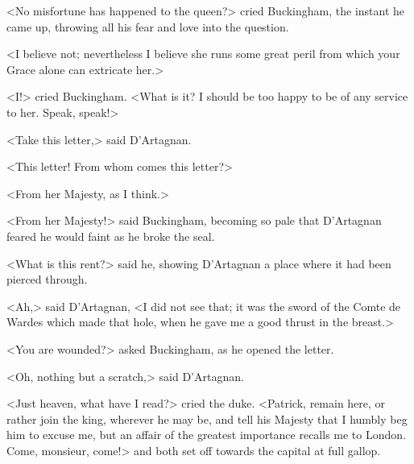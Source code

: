 <No misfortune has happened to the queen?> cried Buckingham, the instant he came up, throwing all his fear and love into the question. 

<I believe not; nevertheless I believe she runs some great peril from which your Grace alone can extricate her.> 

<I\@!> cried Buckingham. <What is it? I should be too happy to be of any service to her. Speak, speak!> 

<Take this letter,> said D'Artagnan. 

<This letter! From whom comes this letter?> 

<From her Majesty, as I think.> 

<From her Majesty!> said Buckingham, becoming so pale that D'Artagnan feared he would faint as he broke the seal. 

<What is this rent?> said he, showing D'Artagnan a place where it had been pierced through. 

<Ah,> said D'Artagnan, <I did not see that; it was the sword of the Comte de Wardes which made that hole, when he gave me a good thrust in the breast.> 

<You are wounded?> asked Buckingham, as he opened the letter. 

<Oh, nothing but a scratch,> said D'Artagnan. 

<Just heaven, what have I read?> cried the duke. <Patrick, remain here, or rather join the king, wherever he may be, and tell his Majesty that I humbly beg him to excuse me, but an affair of the greatest importance recalls me to London. Come, monsieur, come!> and both set off towards the capital at full gallop.
